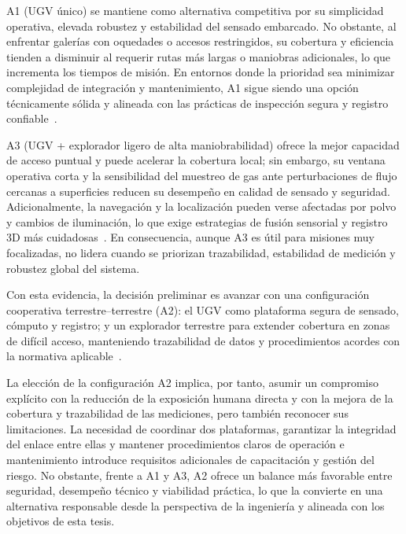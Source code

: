 A1 (UGV único) se mantiene como alternativa competitiva por su simplicidad operativa, elevada robustez y estabilidad del sensado embarcado. No obstante, al enfrentar galerías con oquedades o accesos restringidos, su cobertura y eficiencia tienden a disminuir al requerir rutas más largas o maniobras adicionales, lo que incrementa los tiempos de misión. En entornos donde la prioridad sea minimizar complejidad de integración y mantenimiento, A1 sigue siendo una opción técnicamente sólida y alineada con las prácticas de inspección segura y registro confiable~\cite{MINEM_DS024_2016,AdvancesMining_2023}.

A3 (UGV + explorador ligero de alta maniobrabilidad) ofrece la mejor capacidad de acceso puntual y puede acelerar la cobertura local; sin embargo, su ventana operativa corta y la sensibilidad del muestreo de gas ante perturbaciones de flujo cercanas a superficies reducen su desempeño en calidad de sensado y seguridad. Adicionalmente, la navegación y la localización pueden verse afectadas por polvo y cambios de iluminación, lo que exige estrategias de fusión sensorial y registro 3D más cuidadosas~\cite{KimChoi_2025_MineMapping,EmisionesDiesel_2021,GEI_MinasPeru_2022}. En consecuencia, aunque A3 es útil para misiones muy focalizadas, no lidera cuando se priorizan trazabilidad, estabilidad de medición y robustez global del sistema.

Con esta evidencia, la decisión preliminar es avanzar con una configuración cooperativa terrestre--terrestre (A2): el UGV como plataforma segura de sensado, cómputo y registro; y un explorador terrestre para extender cobertura en zonas de difícil acceso, manteniendo trazabilidad de datos y procedimientos acordes con la normativa aplicable~\cite{MINEM_DS024_2016,OSINERGMIN_BoletinGSM_2020b}.

La elección de la configuración A2 implica, por tanto, asumir un compromiso explícito con la reducción de la exposición humana directa y con la mejora de la cobertura y trazabilidad de las mediciones, pero también reconocer sus limitaciones. La necesidad de coordinar dos plataformas, garantizar la integridad del enlace entre ellas y mantener procedimientos claros de operación e mantenimiento introduce requisitos adicionales de capacitación y gestión del riesgo. No obstante, frente a A1 y A3, A2 ofrece un balance más favorable entre seguridad, desempeño técnico y viabilidad práctica, lo que la convierte en una alternativa responsable desde la perspectiva de la ingeniería y alineada con los objetivos de esta tesis.


